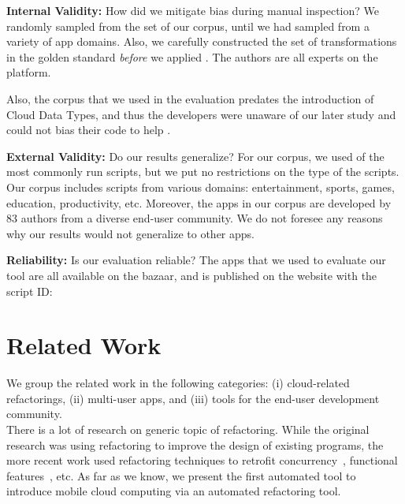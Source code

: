 \documentclass[preprint]{sigplanconf}
\begin{document}
\textbf{Internal Validity:}  How did we mitigate bias during manual inspection? We randomly sampled from the set of our corpus, until we had sampled from a variety of app domains. Also, we carefully constructed the set of transformations in the golden standard \emph{before} we applied \tool. The authors are all experts on the \TD platform.

Also, the corpus that we used in the evaluation predates the introduction of Cloud Data Types, and thus the developers were unaware of our later study and could not bias their code to help \tool. 

\textbf{External Validity:}  Do our results generalize? For our corpus, we used \numScripts of the most commonly run scripts, but we put no restrictions on the type of the scripts.  Our corpus includes scripts from various domains: entertainment, sports, games, education, productivity, etc. Moreover, the apps in our corpus are developed by 83 authors from a diverse end-user community. We do not foresee any reasons why our results would not generalize to other \TD apps.  

\textbf{Reliability:} Is our evaluation reliable? The apps that we used to evaluate our tool are all available on the \TD bazaar, and \tool is published on the \TD website with the script ID: 



\section{Related Work}
\label{sec:relatedWork}

We group the related work in the following categories: (i) cloud-related refactorings, (ii) multi-user apps, and (iii) tools for the end-user development community. \\

There is a lot of research on generic topic of refactoring. While the original research was using refactoring to improve the design of existing programs, the more recent work used refactoring techniques to retrofit 
concurrency~\cite{wloka2009refactoring,dig2009refactoring}, functional features~\cite{Gyori:Lambdaficator}, etc.
As far as we know, we present the first automated tool to introduce mobile cloud computing via an automated refactoring tool.
\end{document}
